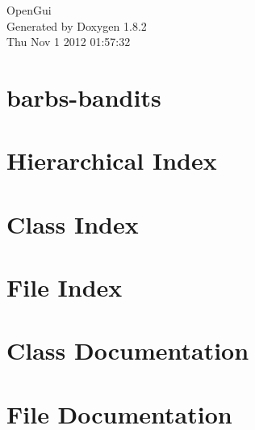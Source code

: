 \documentclass{book}
\begin{document}
\hypersetup{pageanchor=false,citecolor=blue}
\begin{titlepage}
\vspace*{7cm}
\begin{center}
{\Large Open\-Gui }\\
\vspace*{1cm}
{\large Generated by Doxygen 1.8.2}\\
\vspace*{0.5cm}
{\small Thu Nov 1 2012 01:57:32}\\
\end{center}
\end{titlepage}
\clearemptydoublepage
{}
\tableofcontents
\clearemptydoublepage
{}
\hypersetup{pageanchor=true,citecolor=blue}
\chapter{barbs-\/bandits}
\label{md_README}
\hypertarget{md_README}{}

\chapter{Hierarchical Index}

\chapter{Class Index}

\chapter{File Index}

\chapter{Class Documentation}









\chapter{File Documentation}






















\printindex
\end{document}
